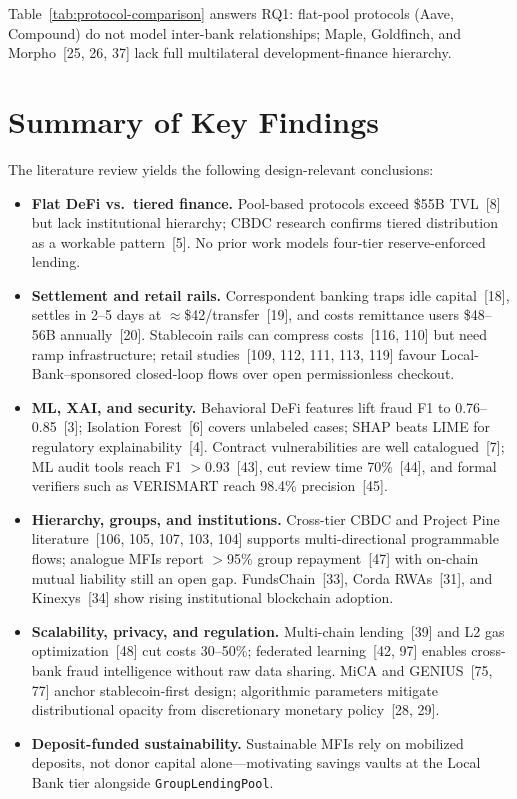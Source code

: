 \documentclass[12pt, a4paper]{report}
\begin{document}
Table~\ref{tab:protocol-comparison} answers RQ1: flat-pool protocols (Aave, Compound) do not model inter-bank relationships; Maple, Goldfinch, and Morpho~[25, 26, 37] lack full multilateral development-finance hierarchy.

\section{Summary of Key Findings}
\label{sec:lit-key-findings}

The literature review yields the following design-relevant conclusions:

\begin{itemize}[noitemsep]
\item \textbf{Flat DeFi vs.\ tiered finance.} Pool-based protocols exceed \$55B TVL~[8] but lack institutional hierarchy; CBDC research confirms tiered distribution as a workable pattern~[5]. No prior work models four-tier reserve-enforced lending.
\item \textbf{Settlement and retail rails.} Correspondent banking traps idle capital~[18], settles in 2--5 days at $\approx$\$42/transfer~[19], and costs remittance users \$48--56B annually~[20]. Stablecoin rails can compress costs~[116, 110] but need ramp infrastructure; retail studies~[109, 112, 111, 113, 119] favour Local-Bank--sponsored closed-loop flows over open permissionless checkout.
\item \textbf{ML, XAI, and security.} Behavioral DeFi features lift fraud F1 to 0.76--0.85~[3]; Isolation Forest~[6] covers unlabeled cases; SHAP beats LIME for regulatory explainability~[4]. Contract vulnerabilities are well catalogued~[7]; ML audit tools reach F1 $>$0.93~[43], cut review time 70\%~[44], and formal verifiers such as VERISMART reach 98.4\% precision~[45].
\item \textbf{Hierarchy, groups, and institutions.} Cross-tier CBDC and Project Pine literature~[106, 105, 107, 103, 104] supports multi-directional programmable flows; analogue MFIs report $>$95\% group repayment~[47] with on-chain mutual liability still an open gap. FundsChain~[33], Corda RWAs~[31], and Kinexys~[34] show rising institutional blockchain adoption.
\item \textbf{Scalability, privacy, and regulation.} Multi-chain lending~[39] and L2 gas optimization~[48] cut costs 30--50\%; federated learning~[42, 97] enables cross-bank fraud intelligence without raw data sharing. MiCA and GENIUS~[75, 77] anchor stablecoin-first design; algorithmic parameters mitigate distributional opacity from discretionary monetary policy~[28, 29].
\item \textbf{Deposit-funded sustainability.} Sustainable MFIs rely on mobilized deposits, not donor capital alone---motivating savings vaults at the Local Bank tier alongside \texttt{GroupLendingPool}.
\end{itemize}
\end{document}
